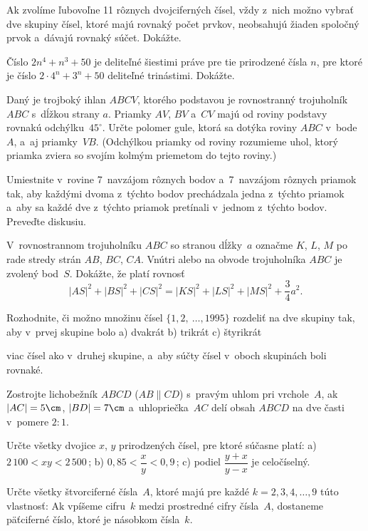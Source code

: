 {%
Ak zvolíme ľubovoľne 11 rôznych dvojciferných čísel, vždy z~nich možno
vybrať dve skupiny čísel, ktoré majú rovnaký počet prvkov, neobsahujú
žiaden spoločný prvok a~dávajú rovnaký súčet. Dokážte.}

{%
Číslo $2n^4+n^3+50$ je deliteľné šiestimi práve  pre tie prirodzené čísla
$n$, pre ktoré je číslo $2\cdot 4^n+3^n+50$ deliteľné trinástimi.
Dokážte.}

{%
Daný je trojboký ihlan $ABCV$, ktorého podstavou je rovnostranný
trojuholník $ABC$ s~dĺžkou strany $a$. Priamky $AV$, $BV$ a~$CV$
majú od roviny podstavy rovnakú odchýlku~$45^\circ$. Určte
polomer gule, ktorá sa dotýka roviny $ABC$ v~bode $A$, a~aj
priamky~$VB$. (Odchýlkou priamky od roviny rozumieme uhol, ktorý
priamka zviera so svojím kolmým priemetom do tejto roviny.)}

{%
Umiestnite v~rovine 7~navzájom rôznych bodov a~7~navzájom rôznych priamok
tak, aby každými dvoma z~týchto bodov prechádzala jedna z~týchto priamok
a~aby sa každé dve z~týchto priamok pretínali v~jednom z~týchto bodov.
Preveďte diskusiu.}

{%
V~rovnostrannom trojuholníku $ABC$ so stranou dĺžky~$a$
označme $K$, $L$, $M$ po rade stredy strán $AB$, $BC$, $CA$.
Vnútri alebo na obvode trojuholníka $ABC$ je zvolený bod~$S$.
Dokážte, že platí rovnosť
$$
|AS|^2+|BS|^2+|C\!S|^2=|KS|^2+|LS|^2+|MS|^2+\frac34a^2.
$$
}

{%
Rozhodnite, či možno množinu čísel $\{1, 2,~ \dots, 1995\}$
rozdeliť na dve skupiny tak, aby v~prvej skupine bolo
\ite a) dvakrát
\ite b) trikrát
\ite c) štyrikrát

viac čísel ako v~druhej skupine, a~aby súčty čísel v~oboch
skupinách boli rovnaké.}

{%
Zostrojte lichobežník $ABCD$  ($AB\parallel CD$)
s~pravým uhlom pri vrchole~$A$, ak $|AC|=5\cm$, $|BD|=7\cm$
a~uhlopriečka~$AC$ delí obsah $ABCD$ na dve časti v~pomere
$2:1$.}

{%
Určte všetky dvojice $x$, $y$ prirodzených čísel, pre ktoré
súčasne platí:
\ite a) $2\,100<xy<2\,500\,$;
\ite b) $0{,}85<\dfrac xy<0{,}9\,$;
\ite c) podiel $\dfrac{y+x}{y-x}$ je celočíselný.
}

{%
Určte všetky štvorciferné čísla~$A$, ktoré majú pre
každé $k=2, 3, 4, \dots, 9$ túto vlastnosť:
Ak vpíšeme cifru~$k$ medzi prostredné cifry čísla~$A$, dostaneme
päťciferné číslo, ktoré je násobkom čísla~$k$.}

